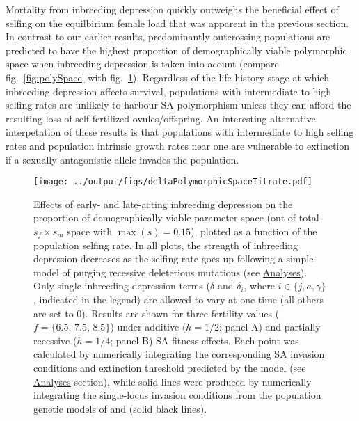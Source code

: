 \documentclass[11pt,draft]{article}
\begin{document}
Mortality from inbreeding depression quickly outweighs the beneficial effect of selfing on the equilbirium female load that was apparent in the previous section. In contrast to our earlier results, predominantly outcrossing populations are predicted to have the highest proportion of demographically viable polymorphic space when inbreeding depression is taken into acount (compare fig.~\ref{fig:polySpace} with fig.~\ref{fig:deltaPolySpace}). Regardless of the life-history stage at which inbreeding depression affects survival, populations with intermediate to high selfing rates are unlikely to harbour SA polymorphism unless they can afford the resulting loss of self-fertilized ovules/offspring. An interesting alternative interpetation of these results is that populations with intermediate to high selfing rates and population intrinsic growth rates near one are vulnerable to extinction if a sexually antagonistic allele invades the population.


 \begin{figure}[htbp]
 \centering
 \texttt{[image: ../output/figs/deltaPolymorphicSpaceTitrate.pdf]}
 \caption{\footnotesize{Effects of early- and late-acting inbreeding depression on the proportion of demographically viable parameter space (out of total $s_f \times s_m$ space with $\max(s) = 0.15$), plotted as a function of the population selfing rate. In all plots, the strength of inbreeding depression decreases as the selfing rate goes up following a simple model of purging recessive deleterious mutations (see \hyperref[subsec:analyses]{Analyses}). Only single inbreeding depression terms ($\delta$ and $\delta_i$, where $i \in \{j,a,\gamma\}$, indicated in the legend) are allowed to vary at one time (all others are set to $0$). Results are shown for three fertility values ($f = \{6.5,\,7.5,\,8.5\}$) under additive ($h = 1/2$; panel A) and partially recessive ($h = 1/4$; panel B) SA fitness effects. Each point was calculated by numerically integrating the corresponding SA invasion conditions and extinction threshold predicted by the model (see \hyperref[subsec:analyses]{Analyses} section), while solid lines were produced by numerically integrating the single-locus invasion conditions from the population genetic models of \citet{JordanConnallon2014} and \citet{Olito2017} (solid black lines).}} 
 \label{fig:deltaPolySpace}
 \end{figure}
\end{document}
